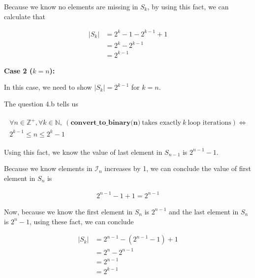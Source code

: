 \documentclass[12pt]{article}
\begin{document}
\begin{enumerate}[a.]
    \bigskip

    Because we know no elements are missing in $S_k$,
    by using this fact, we can calculate that

    \begin{align}
        \lvert S_k \rvert &= 2^k -1 - 2^{k-1} + 1\\
        &= 2^k - 2^{k-1}\\
        &= 2^{k-1}
    \end{align}

    \bigskip

    \textbf{Case 2 ($k = n$):}

    \bigskip

    In this case, we need to show $\lvert S_k \rvert = 2^{k-1}$
    for $k = n$.

    \bigskip

    The question 4.b tells us

    \begin{align}
        \begin{split}
        \forall n \in \mathbb{Z}^+, \forall k \in \mathbb{N},\: (\textbf{
        convert\_to\_binary(n)}\:\text{takes exactly}\:k\:\text{loop iterations}) \Leftrightarrow
        \\ 2^{k-1} \leq n \leq 2^k -1
        \end{split}
    \end{align}

    \bigskip

    Using this fact, we know the value of last element in $S_{n-1}$
    is $2^{n-1} - 1$.

    \bigskip

    Because we know elements in $\mathcal{I}_n$ increases by 1,
    we can conclude the value of first element in $S_n$ is

    \begin{align}
        2^{n-1} - 1 + 1 = 2^{n-1}
    \end{align}

    \bigskip

    Now, because we know the first element in $S_n$ is $2^{n-1}$
    and the last element in $S_n$ is $2^n -1$, using
    these fact, we can conclude

    \begin{align}
        \lvert S_k \rvert &= 2^{n-1} - (2^{n-1} - 1) + 1\\
        &= 2^n - 2^{n-1}\\
        &= 2^{n-1}\\
        &= 2^{k-1}
    \end{align}


\end{enumerate}
\end{document}
